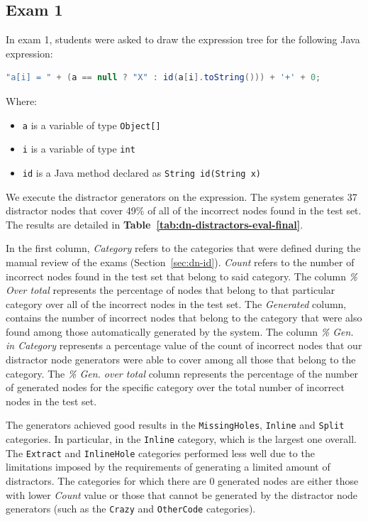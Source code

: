 \begin{chapterBody}
\subsection{Exam 1}

In exam 1, students were asked to draw the expression tree
for the following Java expression:

\begin{lstlisting}[language=java]
"a[i] = " + (a == null ? "X" : id(a[i].toString())) + '+' + 0;
\end{lstlisting}

Where:

\begin{itemize}
    \item \texttt{a} is a variable of type \texttt{Object[]}
    \item \texttt{i} is a variable of type \texttt{int}
    \item \texttt{id} is a Java method declared as
\texttt{String id(String x)}
\end{itemize}

We execute the distractor generators on the expression. The system 
generates 37 distractor nodes that cover 49\% of all of the
incorrect nodes found in the test set. The results are detailed
in \textbf{Table~\ref{tab:dn-distractors-eval-final}}.

In the first column, \textit{Category} refers to the categories that were
defined during the manual review of the exams (Section~\ref{sec:dn-id}).
\textit{Count} refers to the number of incorrect nodes found in the test set
that belong to said category.
The column \textit{{\% Over total}} represents the percentage of nodes that
belong to that particular category over all of the incorrect nodes in the test
set. The \textit{Generated} column, contains the number of incorrect nodes that
belong to the category that were also found among those automatically generated
by the system.
The column \textit{\% Gen. in Category} represents a percentage value of the
count of incorrect nodes that our distractor node generators were able to cover
among all those that belong to the category.
The \textit{\% Gen. over total} column represents the percentage of the number
of generated nodes for the specific category over the total number of incorrect
nodes in the test set.

The generators achieved good results in the \texttt{MissingHoles}, 
\texttt{Inline} and \texttt{Split} categories. In particular, in the
\texttt{Inline} category, which is the largest one overall.
The \texttt{Extract} and \texttt{InlineHole} categories performed less well due
to the limitations imposed by the requirements of generating a limited amount of
distractors.
The categories for which there are 0 generated nodes are either those with lower
\textit{Count} value or those that cannot be generated by the distractor node
generators (such as the \texttt{Crazy} and \texttt{OtherCode} categories).


\end{chapterBody}
